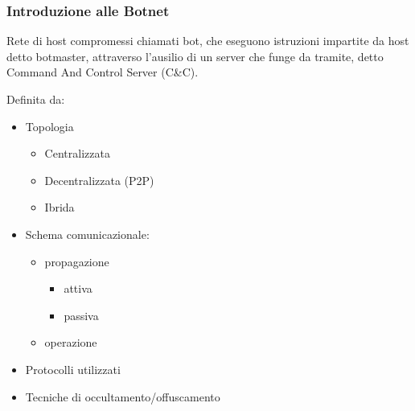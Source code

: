 \begin{frame}
    \titlepage
\end{frame}



\begin{frame}
    \frametitle{Introduzione  alle Botnet}
    \begin{definition}[Botnet]
        Rete di host compromessi chiamati bot, che eseguono istruzioni impartite da host detto botmaster, attraverso l'ausilio di un server che funge da tramite,  detto Command And Control Server (C\&C).
    \end{definition}
    Definita da:
    \begin{itemize}
        \item Topologia
              \begin{itemize}
                  \item Centralizzata
                  \item Decentralizzata (P2P)
                  \item Ibrida
              \end{itemize}
        \item Schema comunicazionale:
              \begin{itemize}
                  \item propagazione
                        \begin{itemize}
                            \item attiva
                            \item passiva
                        \end{itemize}
                  \item operazione
              \end{itemize}
        \item Protocolli utilizzati
        \item Tecniche di occultamento/offuscamento
    \end{itemize}
\end{frame}

